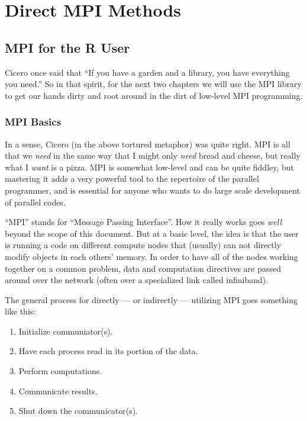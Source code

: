 \part{Direct MPI Methods}


\chapter{MPI for the R User}

Cicero once said that ``If you have a garden and a library, you have everything you need.''  So in that spirit, for the next two chapters we will use the MPI library to get our hands dirty and root around in the dirt of low-level MPI programming.

\section{MPI Basics}

In a sense, Cicero (in the above tortured metaphor) was quite right.  MPI is all that we \emph{need} in the same way that I might only \emph{need} bread and cheese, but really what I \emph{want} is a pizza.  MPI is somewhat low-level and can be quite fiddley, but mastering it adds a very powerful tool to the repertoire of the parallel  programmer, and is essential for anyone who wants to do large scale development of parallel codes.  

``MPI'' stands for ``Message Passing Interface''.  How it really works goes \emph{well} beyond the scope of this document.  But at a basic level, the idea is that the user is running a code on different compute nodes that (usually) can not directly modify objects in each others' memory.  In order to have all of the nodes working together on a common problem, data and computation directives are passed around over the network (often over a specialized link called infiniband).  

The general process for directly --- or indirectly --- utilizing MPI goes something like this:

\begin{enumerate}
 \item Initialize communiator(s).
 \item Have each process read in its portion of the data.
 \item Perform computations.
 \item Communicate results.
 \item Shut down the communicator(s).
\end{enumerate}

